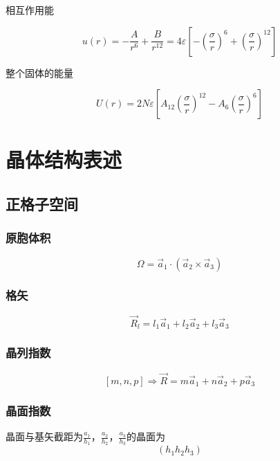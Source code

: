 \documentclass{article}
\begin{document}
\begin{multicols}{2}
相互作用能

\begin{equation*}
  u \left( r \right) = - \frac{A}{r^{6}} + \frac{B}{r^{12}} = 4\varepsilon \left[ - \left( \frac{\sigma}{r} \right)^{6} + \left( \frac{\sigma}{r} \right)^{12} \right] 
\end{equation*}

整个固体的能量

\begin{equation*}
  U \left( r \right) = 2 N \varepsilon \left[ A_{12} \left( \frac{\sigma}{r} \right)^{12} - A_6 \left( \frac{\sigma}{r} \right)^{6} \right] 
\end{equation*}

\section{晶体结构表述}

\subsection{正格子空间}

\subsubsection{原胞体积}

\begin{equation*}
  \Omega = \vec{a}_1 \cdot \left( \vec{a}_2 \times \vec{a}_3 \right)
\end{equation*}

\subsubsection{格矢}

\begin{equation*}
  \vec{R}_l = l_1 \vec{a}_1 + l_2 \vec{a}_2 + l_3 \vec{a}_3
\end{equation*}

\subsubsection{晶列指数}

\begin{equation*}
  \left[ m,n,p \right] \Rightarrow \vec{R} = m \vec{a}_1 + n \vec{a}_2 + p \vec{a}_3 
\end{equation*}

\subsubsection{晶面指数}
晶面与基矢截距为$\frac{a_1}{h_1}$，$\frac{a_2}{h_2}$，$\frac{a_3}{h_3}$的晶面为
\begin{equation*}
  \left( h_1h_2h_3 \right)
\end{equation*}


\end{multicols}
\end{document}
